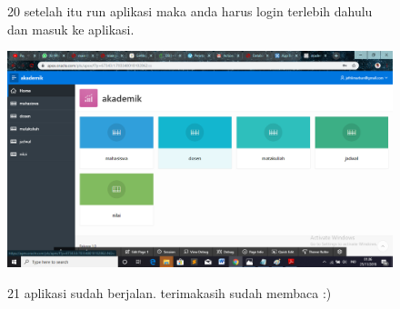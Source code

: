 \begin{enumerate}
\begin{figure}
\item[20]setelah itu run aplikasi maka anda harus login terlebih dahulu dan masuk ke aplikasi.
 \begin{center}
\includegraphics[scale=0.4]{apex/ss24.png}
    \caption{\textit{}}
        \end{center}
\label{gambar}
\end{figure}

\begin{figure}
\item[21]aplikasi sudah berjalan. terimakasih sudah membaca :)
\end{figure}





\end{enumerate}


